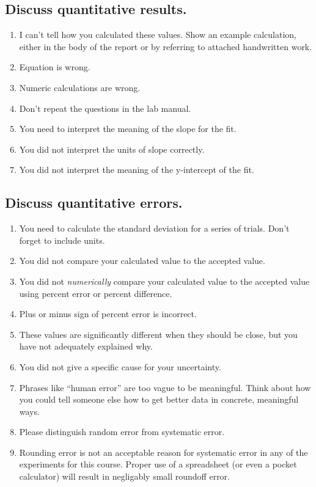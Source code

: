 \documentclass[12pt,letterpaper]{article}
\begin{document}
\begin{multicols}{2}
\subsection*{Discuss quantitative results.}

\begin{enumerate}[start=120]
  \item I can't tell how you calculated these values.
    Show an example calculation, either in the body of the report
    or by referring to attached handwritten work.
  \item Equation is wrong.
  \item Numeric calculations are wrong.
  \item Don't repeat the questions in the lab manual.
  \item You need to interpret the meaning of the slope for the fit.
  \item You did not interpret the units of slope correctly.
  \item You did not interpret the meaning of the y-intercept of the fit.
\end{enumerate}

\subsection*{Discuss quantitative errors.}

\begin{enumerate}[start=130]
  \item You need to calculate the standard deviation
    for a series of trials. Don't forget to include units.
  \item You did not compare your calculated value to the accepted value.
  \item You did not \emph{numerically} compare your calculated value
    to the accepted value using percent error or percent difference.
  \item Plus or minus sign of percent error is incorrect.
  \item These values are significantly different when they should be close,
    but you have not adequately explained why.
  \item You did not give a specific cause for your uncertainty.
  \item Phrases like ``human error'' are too vague to be meaningful.
    Think about how you could tell someone else how to get better data
    in concrete, meaningful ways.
  \item Please distinguish random error from systematic error.
  \item Rounding error is not an acceptable reason for systematic error
    in any of the experiments for this course.
    Proper use of a spreadsheet (or even a pocket calculator)
    will result in negligably small roundoff error.
\end{enumerate}


\end{multicols}
\end{document}

